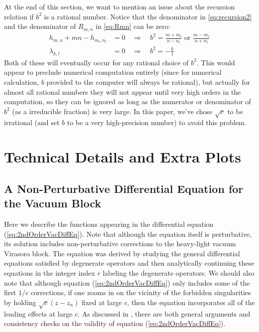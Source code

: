 \begin{subappendices}
At the end of this section, we want to mention an issue about the recursion relation if $b^2$ is a rational number. Notice that the denominator in \ref{eq:recursion2} and the denominator of $R_{m,n}$ in \ref{eq:Rmn} can be zero:
 \begin{align}
	h_{m,n} + mn - h_{m_l,n_l} &= 0\quad \Rightarrow \quad b^2=\frac{m+m_l}{n-n_l} \text{ or } \frac{m-m_l}{n+n_l}\\
	\lambda_{k,l} &=0\quad \Rightarrow \quad b^2=-\frac{k}{l}
	\end{align}
Both of these will eventually occur for any rational choice of $b^2$.  This would appear to preclude numerical computation entirely (since for numerical calculation, $b$ provided to the computer will always be rational), but actually for almost all rational numbers they will not appear until very high orders in the computation, so they can be ignored as long as the numerator or denominator of $b^2$ (as a irreducible fraction) is very large. In this paper, we've chose $\sqrt{c}$ to be irrational (and set $b$ to be a very high-precision number) to avoid this problem.


\section{Technical Details and Extra Plots}

\subsection{A Non-Perturbative Differential Equation for the Vacuum Block}
\label{app:DiffEqforVac}

Here we describe the functions appearing in the differential equation (\ref{eq:2ndOrderVacDiffEq}).  Note that although the equation itself is perturbative, its solution includes non-perturbative corrections to the heavy-light vacuum Virasoro block.
The equation was derived \cite{Fitzpatrick:2016ive} by studying the general  differential equations satisfied by degenerate operators and then analytically continuing these equations in the integer index $r$ labeling the degenerate operators.  We should also note that although equation (\ref{eq:2ndOrderVacDiffEq}) only includes some of the first $1/c$ corrections, if one zooms in on the vicinity of the forbidden singularities by holding $\sqrt{c} (z-z_n)$ fixed at large $c$, then the equation incorporates all of the leading effects at large $c$.  As discussed in \cite{Fitzpatrick:2016ive}, there are both general arguments and consistency checks on the validity of equation (\ref{eq:2ndOrderVacDiffEq}).  


\end{subappendices}
